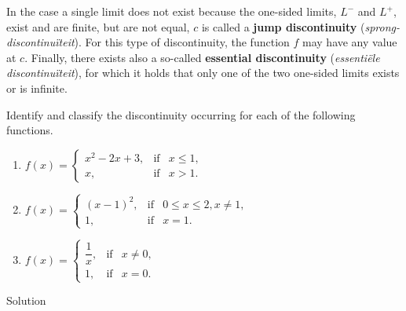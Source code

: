 In the case a single limit does not exist because the one-sided limits, $L^-$ and $L^+$, exist and are finite, but are not equal, $c$ is called a \textbf{jump discontinuity} (\textit{sprong-discontinu\"iteit}). For this type of discontinuity, the function $f$ may have any value at $c$. Finally, there exists also a so-called \textbf{essential discontinuity} (\textit{essenti\"ele discontinu\"iteit}), for which it holds that only one of the two one-sided limits exists or is  infinite.


\begin{example}

Identify and classify the discontinuity occurring for each of the following functions.
\begin{multicols}{2}
\begin{enumerate}
\item $f(x)=\left\{\begin{array}{lcl} x^2-2x+3, & \mbox{if} &  x\leq 1, \\ x, & \mbox{if} &  x>1. \end{array}\right.$
\item $f(x) = \left\{\begin{array}{lcl} (x-1)^2, & \mbox{if} &  0\leq x\leq 2, x\neq 1,\\ 1, & \mbox{if} &  x=1.\end{array}\right.$
\item $f(x)=\left\{\begin{array}{lcl} \dfrac{1}{x}, &  \mbox{if} & x\neq 0, \\ 1, & \mbox{if} &  x=0. \end{array}\right.$
\end{enumerate}
\end{multicols}

Solution 



\end{example}
